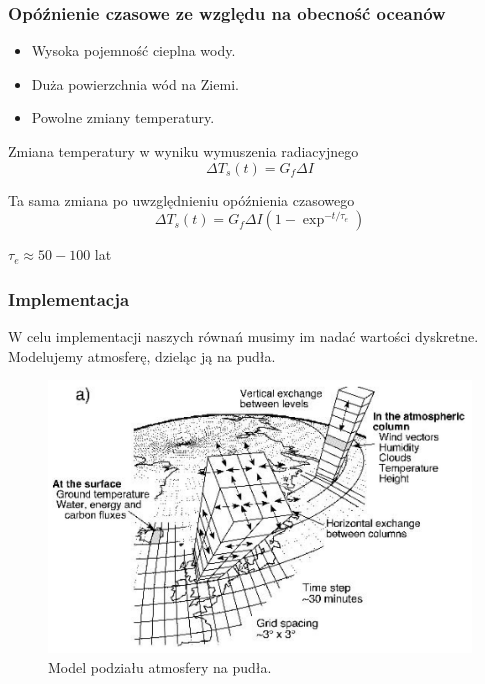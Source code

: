 \documentclass{beamer}
\begin{document}
\begin{frame}
	\frametitle{Opóźnienie czasowe ze względu na obecność oceanów}
	
	\begin{itemize}
		\item Wysoka pojemność cieplna wody.
		
		\item Duża powierzchnia wód na Ziemi.
		
		\item Powolne zmiany temperatury.
	
	\end{itemize}
	
	\begin{block}{Zmiana temperatury w wyniku wymuszenia radiacyjnego}
		\[\Delta T_s(t) = G_f\Delta I
		\]
	\end{block}
	
	\begin{block}{Ta sama zmiana po uwzględnieniu opóźnienia czasowego}
		\[\Delta T_s(t) = G_f\Delta I(1-\exp^{-t/\tau _e})
		\]
	\end{block}
	
	$\tau _e \approx 50-100$ lat
	
\end{frame}






\begin{frame}
	\frametitle{Implementacja}
	W celu implementacji naszych równań musimy im nadać wartości dyskretne.
	Modelujemy atmosferę, dzieląc ją na pudła.
	
	\begin{figure}[h]
		\begin{center}
			\includegraphics[width=0.7\linewidth]{images/box.png}
			\caption{Model podziału atmosfery na pudła.}
		\end{center}
	\end{figure}
	
\end{frame}
\end{document}
